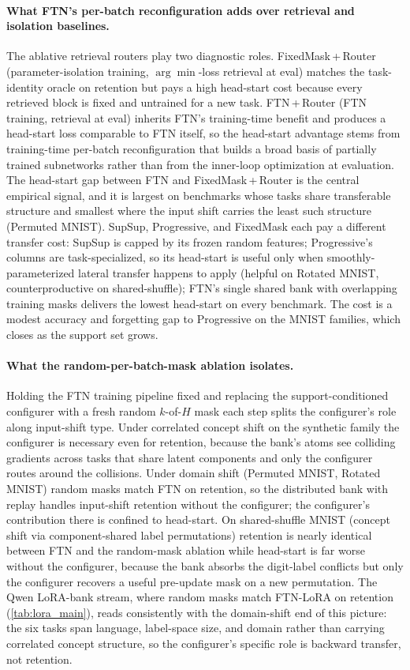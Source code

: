 \documentclass{article}
\begin{document}
\paragraph{What FTN's per-batch reconfiguration adds over retrieval and isolation baselines.}
The ablative retrieval routers play two diagnostic roles. FixedMask\,+\,Router (parameter-isolation training, $\arg\min$-loss retrieval at eval) matches the task-identity oracle on retention but pays a high head-start cost because every retrieved block is fixed and untrained for a new task. FTN\,+\,Router (FTN training, retrieval at eval) inherits FTN's training-time benefit and produces a head-start loss comparable to FTN itself, so the head-start advantage stems from training-time per-batch reconfiguration that builds a broad basis of partially trained subnetworks rather than from the inner-loop optimization at evaluation. The head-start gap between FTN and FixedMask\,+\,Router is the central empirical signal, and it is largest on benchmarks whose tasks share transferable structure and smallest where the input shift carries the least such structure (Permuted MNIST). SupSup, Progressive, and FixedMask each pay a different transfer cost: SupSup is capped by its frozen random features; Progressive's columns are task-specialized, so its head-start is useful only when smoothly-parameterized lateral transfer happens to apply (helpful on Rotated MNIST, counterproductive on shared-shuffle); FTN's single shared bank with overlapping training masks delivers the lowest head-start on every benchmark. The cost is a modest accuracy and forgetting gap to Progressive on the MNIST families, which closes as the support set grows.

\paragraph{What the random-per-batch-mask ablation isolates.}
Holding the FTN training pipeline fixed and replacing the support-conditioned configurer with a fresh random $k$-of-$H$ mask each step splits the configurer's role along input-shift type. Under correlated concept shift on the synthetic family the configurer is necessary even for retention, because the bank's atoms see colliding gradients across tasks that share latent components and only the configurer routes around the collisions. Under domain shift (Permuted MNIST, Rotated MNIST) random masks match FTN on retention, so the distributed bank with replay handles input-shift retention without the configurer; the configurer's contribution there is confined to head-start. On shared-shuffle MNIST (concept shift via component-shared label permutations) retention is nearly identical between FTN and the random-mask ablation while head-start is far worse without the configurer, because the bank absorbs the digit-label conflicts but only the configurer recovers a useful pre-update mask on a new permutation. The Qwen LoRA-bank stream, where random masks match FTN-LoRA on retention (\cref{tab:lora_main}), reads consistently with the domain-shift end of this picture: the six tasks span language, label-space size, and domain rather than carrying correlated concept structure, so the configurer's specific role is backward transfer, not retention.
\end{document}
